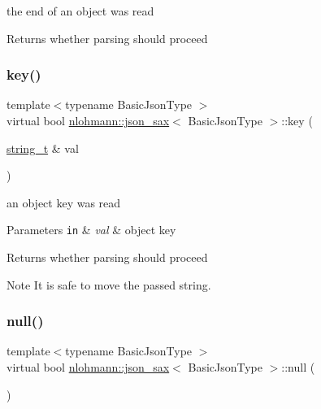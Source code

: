 the end of an object was read 

\begin{DoxyReturn}{Returns}
whether parsing should proceed 
\end{DoxyReturn}
\mbox{\label{structnlohmann_1_1json__sax_a2e0c7ecd80b18d18a8cc76f71cfc2028}} 
\subsubsection{\texorpdfstring{key()}{key()}}
{\footnotesize\ttfamily template$<$typename Basic\+Json\+Type $>$ \\
virtual bool \hyperlink{structnlohmann_1_1json__sax}{nlohmann\+::json\+\_\+sax}$<$ Basic\+Json\+Type $>$\+::key (\begin{DoxyParamCaption}\item[{\hyperlink{structnlohmann_1_1json__sax_ae01977a9f3c5b3667b7a2929ed91061e}{string\+\_\+t} \&}]{val }\end{DoxyParamCaption})\hspace{0.3cm}{\ttfamily [pure virtual]}}



an object key was read 


\begin{DoxyParams}[1]{Parameters}
\mbox{\tt in}  & {\em val} & object key \\
\hline
\end{DoxyParams}
\begin{DoxyReturn}{Returns}
whether parsing should proceed 
\end{DoxyReturn}
\begin{DoxyNote}{Note}
It is safe to move the passed string. 
\end{DoxyNote}
\mbox{\label{structnlohmann_1_1json__sax_a0ad26edef3f8d530dcec3192bba82df6}} 
\subsubsection{\texorpdfstring{null()}{null()}}
{\footnotesize\ttfamily template$<$typename Basic\+Json\+Type $>$ \\
virtual bool \hyperlink{structnlohmann_1_1json__sax}{nlohmann\+::json\+\_\+sax}$<$ Basic\+Json\+Type $>$\+::null (\begin{DoxyParamCaption}{ }\end{DoxyParamCaption})\hspace{0.3cm}{\ttfamily [pure virtual]}}



